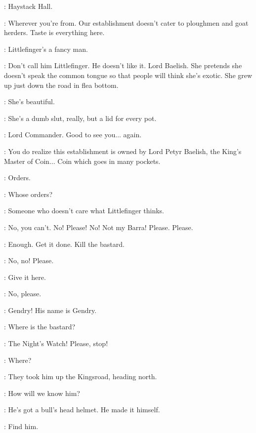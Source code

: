 \DAISY: Haystack Hall.

\ROS: Wherever you're from. Our establishment doesn't cater to ploughmen and goat herders. Taste is everything here.

\DAISY: Littlefinger's a fancy man.

\ROS: Don't call him Littlefinger. He doesn't like it. Lord Baelish.  She pretends she doesn't speak the common tongue so that people will think she's exotic. She grew up just down the road in flea bottom.

\DAISY: She's beautiful.

\ROS: She's a dumb slut, really, but a lid for every pot.


\ROS: Lord Commander. Good to see you$\ldots$ again.


\ROS: You do realize this establishment is owned by Lord Petyr Baelish, the King's Master of Coin$\ldots$ Coin which goes in many pockets.

\JANOSSLYNT: Orders.

\ROS: Whose orders?

\JANOSSLYNT: Someone who doesn't care what Littlefinger thinks.


\MHAEGEN: No, you can't. No! Please! No! Not my Barra! Please. Please.

\JANOSSLYNT: Enough. Get it done. Kill the bastard.


\MHAEGEN: No, no! Please.

\JANOSSLYNT: Give it here.

\MHAEGEN: No, please.



\scene



\TOBHOMOTT: Gendry! His name is Gendry.

\JANOSSLYNT: Where is the bastard?

\TOBHOMOTT: The Night's Watch! Please, stop!

\JANOSSLYNT: Where?

\TOBHOMOTT: They took him up the Kingsroad, heading north.

\JANOSSLYNT: How will we know him?

\TOBHOMOTT: He's got a bull's head helmet. He made it himself.

\JANOSSLYNT:  Find him.




